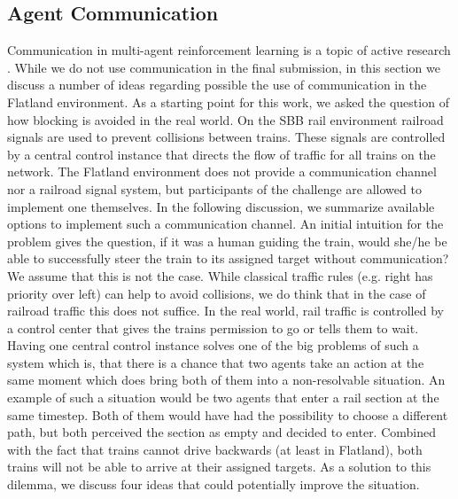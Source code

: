 \subsection*{Agent Communication}\label{agent_communication}
Communication in multi-agent reinforcement learning is a topic of active research \cite{marlsurvey}. While we do not use communication in the final submission, in this section we discuss a number of ideas regarding possible the use of communication in the Flatland environment. As a starting point for this work, we asked the question of how blocking is avoided in the real world. On the SBB rail environment railroad signals are used to prevent collisions between trains. These signals are controlled by a central control instance that directs the flow of traffic for all trains on the network.
The Flatland environment does not provide a communication channel nor a railroad signal system, but participants of the challenge are allowed to implement one themselves. In the following discussion, we summarize available options to implement such a communication channel. An initial intuition for the problem gives the question, if it was a human guiding the train, would she/he be able to successfully steer the train to its assigned target without communication?
We assume that this is not the case. While classical traffic rules (e.g. right has priority over left) can help to avoid collisions, we do think that in the case of railroad traffic this does not suffice. In the real world, rail traffic is controlled by a control center that gives the trains permission to go or tells them to wait. Having one central control instance solves one of the big problems of such a system which is, that there is a chance that two agents take an action at the same moment which does bring both of them into a non-resolvable situation. An example of such a situation would be two agents that enter a rail section at the same timestep. Both of them would have had the possibility to choose a different path, but both perceived the section as empty and decided to enter. Combined with the fact that trains cannot drive backwards (at least in Flatland), both trains will not be able to arrive at their assigned targets. As a solution to this dilemma, we discuss four ideas that could potentially improve the situation.
